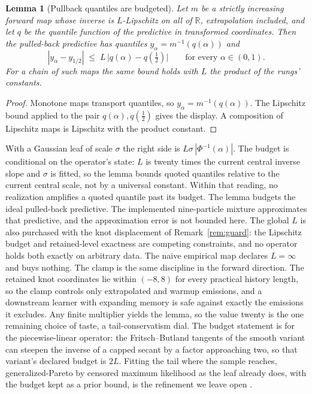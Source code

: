 \documentclass[11pt]{article}
\newtheorem{lemma}[proposition]{Lemma}
\theoremstyle{remark}
\begin{document}
\begin{lemma}[Pullback quantiles are budgeted]\label{lem:budget}
Let $m$ be a strictly increasing forward map whose inverse is $L$-Lipschitz on all of $\mathbb{R}$,
extrapolation included, and let $q$ be the quantile function of the predictive in
transformed coordinates. Then the pulled-back predictive has quantiles
$y_\alpha = m^{-1}(q(\alpha))$ and
\[
  |y_\alpha - y_{1/2}| \;\le\; L\,\big|q(\alpha) - q(\tfrac12)\big|
  \qquad \text{for every } \alpha \in (0,1).
\]
For a chain of such maps the same bound holds with $L$ the product of the rungs'
constants.
\end{lemma}

\begin{proof}
Monotone maps transport quantiles, so $y_\alpha = m^{-1}(q(\alpha))$. The Lipschitz bound
applied to the pair $q(\alpha), q(\tfrac12)$ gives the display. A composition of
Lipschitz maps is Lipschitz with the product constant.
\end{proof}

With a Gaussian leaf of scale $\sigma$ the right side is
$L\sigma\,|\Phi^{-1}(\alpha)|$. The budget is conditional on the operator's state:
$L$ is twenty times the current central inverse slope and $\sigma$ is fitted, so the
lemma bounds quoted quantiles relative to the current central scale, not by a
universal constant. Within that reading, no realization amplifies a quoted quantile
past its budget. The lemma budgets the ideal pulled-back predictive. The
implemented nine-particle mixture approximates that predictive, and the
approximation error is not bounded here. The global $L$ is also purchased with the knot displacement of
Remark~\ref{rem:guard}: the Lipschitz budget and retained-level exactness are
competing constraints, and no operator holds both exactly on arbitrary data. The naive empirical map declares $L = \infty$ and buys nothing. The clamp is
the same discipline in the forward direction. The retained knot coordinates lie
within $(-8, 8)$ for every practical history length, so the clamp controls only
extrapolated and warmup emissions, and a downstream learner with expanding memory is
safe against exactly the emissions it excludes. Any finite multiplier yields the
lemma, so the value twenty is the one remaining choice of taste, a tail-conservatism
dial. The budget statement is for the piecewise-linear operator: the
Fritsch--Butland tangents of the smooth variant can steepen the inverse of a capped
secant by a factor approaching two, so that variant's declared budget is $2L$. Fitting the tail where the sample reaches, generalized-Pareto by censored maximum
likelihood as the leaf already does, with the budget kept as a prior bound, is the
refinement we leave open \citep[the tail instability of the normal quantile
transform is documented by][]{bogner2012normal}.
\end{document}
